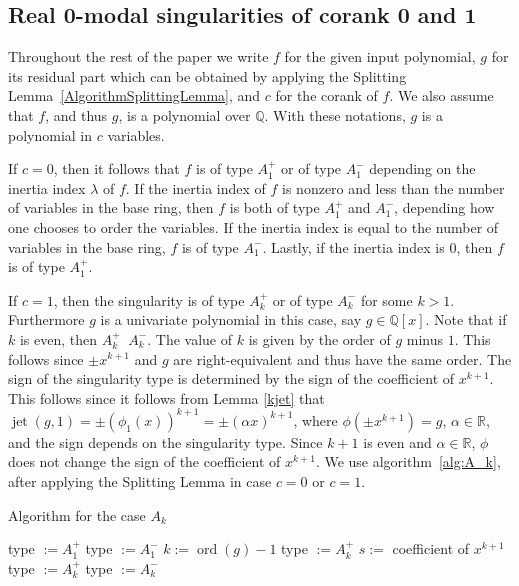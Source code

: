 \documentclass[noend]{amsproc}
\DeclareMathOperator{\ord}{ord}
\DeclareMathOperator{\requiv}{\overset{r}{\sim}}
\DeclareMathOperator{\jt}{jet}
\begin{document}
\subsection{Real $\mathbf{0}$-modal singularities of corank $\mathbf{0}$ and
$\mathbf{1}$}%
\label{RealSingularitiesOfZeroModality}

Throughout the rest of the paper we write $f$ for the given input polynomial,
$g$ for its residual part which can be obtained by applying the Splitting
Lemma~\ref{AlgorithmSplittingLemma}, and $c$ for the corank of $f$.
We also assume that $f$, and thus $g$, is a polynomial over $\mathbb Q$.
With these notations, $g$ is a polynomial in $c$ variables.

If $c = 0$, then it follows  that $f$ is of type
$A_1^+$ or of type $A_1^-$ depending on the inertia index $\lambda$ of $f$. If
the inertia index of $f$ is nonzero and less than the number of variables in
the base ring, then $f$ is both of type $A_1^+$ and $A_1^-$, depending how one
chooses to order the variables. If the inertia index is equal to the number of
variables in the base ring, $f$ is of type $A_1^-$. Lastly, if the inertia
index is $0$, then $f$ is of type $A_1^+$.

If $c=1$, then the singularity is of type
$A_k^+$ or of type $A_k^-$ for some $k>1$. Furthermore $g$ is a univariate
polynomial in this case, say $g\in\mathbb Q[x]$. Note that if $k$ is even, then
$A_k^+\requiv A_k^-$. The value of $k$ is given by the order of $g$ minus $1$.
This follows since $\pm x^{k+1}$ and $g$ are right-equivalent and thus have the
same order. The sign of the singularity type is determined by the sign of the
coefficient of $x^{k+1}$. This follows since it follows from Lemma \ref{kjet}
that $\jt(g,1)=\pm(\phi_1(x))^{k+1}=\pm(\alpha x)^{k+1}$, where $\phi(\pm
x^{k+1})=g$, $\alpha\in\mathbb R$, and the sign depends on the singularity
type.  Since $k+1$ is even and $\alpha\in\mathbb R$, $\phi$ does not change the
sign of the coefficient of $x^{k+1}$. We use algorithm~\ref{alg:A_k}, after
applying the Splitting Lemma in case $c=0$ or $c=1$.

\begin{algorithm}[h]
\caption{\label{alg:A_k} Algorithm for the case $A_k$}
\begin{algorithmic}[1]



\STATE type $:=A_1^+$
\ELSE
\STATE type $:=A_1^-$
\ENDIF
\ENDIF
{}
\STATE $k:= \ord(g)-1$
\STATE type $:=A_k^+$
\ELSE
\STATE $s:=$ coefficient of $x^{k+1}$
\STATE type $:=A_k^+$
\ELSE
\STATE type $:=A_k^-$
\ENDIF
\ENDIF
\ENDIF
{}

\end{algorithmic}
\end{algorithm}
\end{document}
